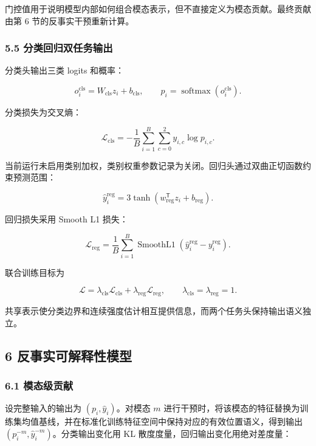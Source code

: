 \documentclass[
  12pt,
  a4paper,
]{ctexart}
\begin{document}
门控值用于说明模型内部如何组合模态表示，但不直接定义为模态贡献。最终贡献由第
6 节的反事实干预重新计算。

\hypertarget{ux5206ux7c7bux56deux5f52ux53ccux4efbux52a1ux8f93ux51fa}{%
\subsubsection{5.5
分类回归双任务输出}\label{ux5206ux7c7bux56deux5f52ux53ccux4efbux52a1ux8f93ux51fa}}

分类头输出三类 logits 和概率：

\[
o_i^{\mathrm{cls}}=W_{\mathrm{cls}}z_i+b_{\mathrm{cls}},\qquad
p_i=\operatorname{softmax}\left(o_i^{\mathrm{cls}}\right).
\tag{15}
\]

分类损失为交叉熵：

\[
\mathcal L_{\mathrm{cls}}=-\frac{1}{B}
\sum_{i=1}^{B}\sum_{c=0}^{2}y_{i,c}\log p_{i,c}.
\tag{16}
\]

当前运行未启用类别加权，类别权重参数记录为关闭。回归头通过双曲正切函数约束预测范围：

\[
\hat y_i^{\mathrm{reg}}=3\tanh\left(w_{\mathrm{reg}}^{\mathsf T}z_i+b_{\mathrm{reg}}\right).
\tag{17}
\]

回归损失采用 Smooth L1 损失：

\[
\mathcal L_{\mathrm{reg}}=\frac{1}{B}\sum_{i=1}^{B}
\operatorname{SmoothL1}\left(\hat y_i^{\mathrm{reg}}-y_i^{\mathrm{reg}}\right).
\tag{18}
\]

联合训练目标为

\[
\mathcal L=\lambda_{\mathrm{cls}}\mathcal L_{\mathrm{cls}}
 +\lambda_{\mathrm{reg}}\mathcal L_{\mathrm{reg}},
\qquad \lambda_{\mathrm{cls}}=\lambda_{\mathrm{reg}}=1.
\tag{19}
\]

共享表示使分类边界和连续强度估计相互提供信息，而两个任务头保持输出语义独立。

\hypertarget{ux53cdux4e8bux5b9eux53efux89e3ux91caux6027ux6a21ux578b}{%
\subsection{6
反事实可解释性模型}\label{ux53cdux4e8bux5b9eux53efux89e3ux91caux6027ux6a21ux578b}}

\hypertarget{ux6a21ux6001ux7ea7ux8d21ux732e}{%
\subsubsection{6.1 模态级贡献}\label{ux6a21ux6001ux7ea7ux8d21ux732e}}

设完整输入的输出为 \((p_i,\hat y_i)\)。对模态 \(m\)
进行干预时，将该模态的特征替换为训练集均值基线，并在标准化训练特征空间中保持对应的有效位置语义，得到输出
\((p_i^{-m},\hat y_i^{-m})\)。分类输出变化用 KL
散度度量，回归输出变化用绝对差度量：
\end{document}
